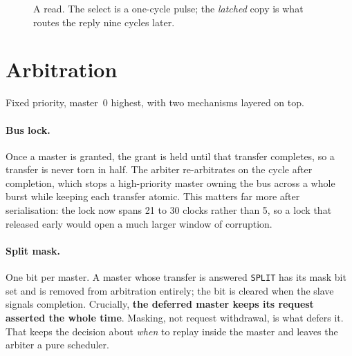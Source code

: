 \documentclass[11pt,a4paper]{article}
\newcommand{\sig}[1]{\texttt{#1}}
\begin{document}
\begin{figure}[htb]
\centering
{}
\caption{A read. The select is a one-cycle pulse; the \emph{latched} copy is
what routes the reply nine cycles later.}
\end{figure}

\section{Arbitration}

Fixed priority, master~0 highest, with two mechanisms layered on top.

\paragraph{Bus lock.} Once a master is granted, the grant is held until that
transfer completes, so a transfer is never torn in half. The arbiter
re-arbitrates on the cycle after completion, which stops a high-priority
master owning the bus across a whole burst while keeping each transfer
atomic. This matters far more after serialisation: the lock now spans 21 to
30 clocks rather than 5, so a lock that released early would open a much
larger window of corruption.

\paragraph{Split mask.} One bit per master. A master whose transfer is
answered \sig{SPLIT} has its mask bit set and is removed from arbitration
entirely; the bit is cleared when the slave signals completion. Crucially,
\textbf{the deferred master keeps its request asserted the whole time}.
Masking, not request withdrawal, is what defers it. That keeps the decision
about \emph{when} to replay inside the master and leaves the arbiter a pure
scheduler.
\end{document}
